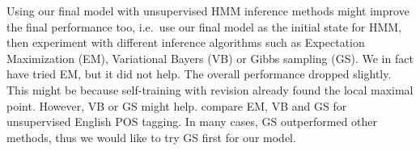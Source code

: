 Using our final model with unsupervised HMM inference methods might improve the final performance too, i.e.\ use our final model as the initial state for HMM, then experiment with different inference algorithms such as Expectation Maximization (EM), Variational Bayers (VB) or Gibbs sampling (GS). We in fact have tried EM, but it did not help. The overall performance dropped slightly. This might be because self-training with revision already found the local maximal point. However, VB or GS might help.  compare EM, VB and GS for unsupervised English POS tagging. In many cases, GS outperformed other methods, thus we would like to try GS first for our model. 
